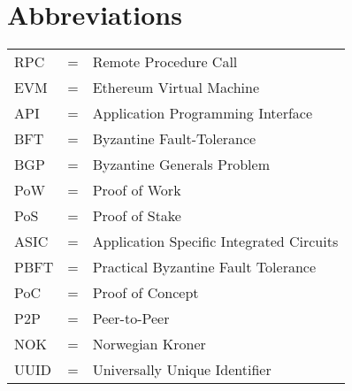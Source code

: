 \chapter*{Abbreviations}

\noindent 
\begin{center}
\begin{tabular}{ l c l }
   RPC & = & Remote Procedure Call \\
   EVM & = & Ethereum Virtual Machine \\
   API & = & Application Programming Interface \\
   BFT & = & Byzantine Fault-Tolerance \\
   BGP & = & Byzantine Generals Problem \\
   PoW & = & Proof of Work \\
   PoS & = & Proof of Stake \\
   ASIC & = & Application Specific Integrated Circuits \\
   PBFT & = & Practical Byzantine Fault Tolerance \\
   PoC & = & Proof of Concept \\
   P2P & = & Peer-to-Peer \\
   NOK & = & Norwegian Kroner \\
   UUID & = & Universally Unique Identifier \\
   
   
   
   


\end{tabular}
\end{center}
